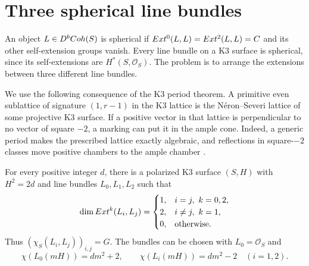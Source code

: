 \section{Three spherical line bundles}
\label{k3:sec:spherical}

An object $L\in D^bCoh(S)$ is spherical if
$Ext^0(L,L)=Ext^2(L,L)=C$ and its other self-extension groups
vanish.  Every line bundle on a K3 surface is spherical, since its
self-extensions are $H^*(S,\mathcal O_S)$.  The problem is to arrange
the extensions between three different line bundles.

We use the following consequence of the K3 period theorem.  A
primitive even sublattice of signature $(1,r-1)$ in the K3 lattice is
the N\'eron--Severi lattice of some projective K3 surface.  If a
positive vector in that lattice is perpendicular to no vector of
square $-2$, a marking can put it in the ample cone.  Indeed, a
generic period makes the prescribed lattice exactly algebraic, and
reflections in square-$-2$ classes move positive chambers to the ample
chamber \cite[Chapters~7, 8 and 14]{HuybrechtsK3}.

\begin{proposition}
\label{k3:prop:first-triple}
For every positive integer $d$, there is a polarized K3 surface
$(S,H)$ with $H^2=2d$ and line bundles $L_0,L_1,L_2$ such that
\[
\dim Ext^k(L_i,L_j)=
\begin{cases}
1,&i=j,\ k=0,2,\\
2,&i\ne j,\ k=1,\\
0,&\text{otherwise}.
\end{cases}
\]
Thus $(\chi_S(L_i,L_j))_{i,j}=G$.
The bundles can be chosen with $L_0=\mathcal O_S$ and
\[
\chi(L_0(mH))=dm^2+2,\qquad
\chi(L_i(mH))=dm^2-2\quad(i=1,2).
\]
\end{proposition}

